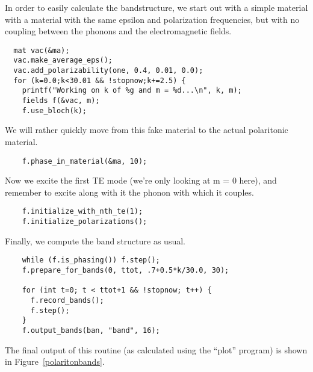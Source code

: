 In order to easily calculate the bandstructure, we start out with a simple
material with a material with the same epsilon and polarization
frequencies, but with no coupling between the phonons and the
electromagnetic fields.

\begin{verbatim}
  mat vac(&ma);
  vac.make_average_eps();
  vac.add_polarizability(one, 0.4, 0.01, 0.0);
  for (k=0.0;k<30.01 && !stopnow;k+=2.5) {
    printf("Working on k of %g and m = %d...\n", k, m);
    fields f(&vac, m);
    f.use_bloch(k);
\end{verbatim}

We will rather quickly move from this fake material to the actual
polaritonic material.

\begin{verbatim}
    f.phase_in_material(&ma, 10);
\end{verbatim}

Now we excite the first TE mode (we're only looking at m = 0 here), and
remember to excite along with it the phonon with which it couples.

\begin{verbatim}
    f.initialize_with_nth_te(1);
    f.initialize_polarizations();
\end{verbatim}

Finally, we compute the band structure as usual.

\begin{verbatim}
    while (f.is_phasing()) f.step();
    f.prepare_for_bands(0, ttot, .7+0.5*k/30.0, 30);
    
    for (int t=0; t < ttot+1 && !stopnow; t++) {
      f.record_bands();
      f.step();
    }
    f.output_bands(ban, "band", 16);
\end{verbatim}
\begin{comment}
    fflush(ban);
  }
  fclose(ban);
}
\end{comment}

The final output of this routine (as calculated using the ``plot'' program)
is shown in Figure~\ref{polaritonbands}.
